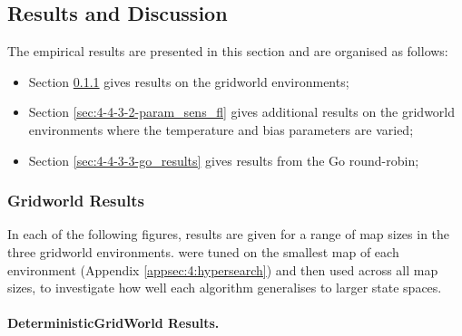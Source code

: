             










\subsection{Results and Discussion}
\label{sec:4-4-3-results_and_discussion}

    The empirical results are presented in this section and are organised as follows:
    \begin{itemize}
        \item Section \ref{sec:4-4-3-1-gridworld_results} gives results on the gridworld environments;
        \item Section \ref{sec:4-4-3-2-param_sens_fl} gives additional results on the gridworld environments where the temperature and bias parameters are varied;
        \item Section \ref{sec:4-4-3-3-go_results} gives results from the Go round-robin;
    \end{itemize}








\subsubsection{Gridworld Results}
\label{sec:4-4-3-1-gridworld_results}

    In each of the following figures, results are given for 
    a range of map sizes in the three gridworld environments. 
     were tuned on the smallest map of each 
    environment (Appendix \ref{appsec:4:hypersearch}) and then used across all map sizes, to 
    investigate how well each algorithm generalises to 
    larger state spaces.





    \paragraph{DeterministicGridWorld Results.}

